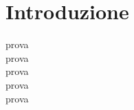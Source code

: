 \chapter*{Introduzione}

prova
\\[1\baselineskip]
prova
\\[2\baselineskip]
prova
\\[2\baselineskip]
prova
\\[2\baselineskip]
prova
